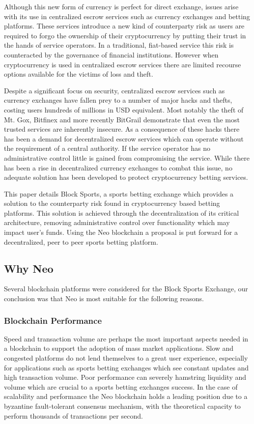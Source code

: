 \documentclass{article}
\begin{document}
Although this new form of currency is perfect for direct exchange, issues arise with its use in centralized escrow services such as currency exchanges and betting platforms. These services introduce a new kind of counterparty risk as users are required to forgo the ownership of their cryptocurrency by putting their trust in the hands of service operators. In a traditional, fiat-based service this risk is counteracted by the governance of financial institutions. However when cryptocurrency is used in centralized escrow services there are limited recourse options available for the victims of loss and theft.

Despite a significant focus on security, centralized escrow services such as currency exchanges have fallen prey to a number of major hacks and thefts, costing users hundreds of millions in USD equivalent. Most notably the theft of Mt. Gox, Bitfinex and more recently BitGrail demonstrate that even the most trusted services are inherently insecure. As a consequence of these hacks there has been a demand for decentralized escrow services which can operate without the requirement of a central authority. If the service operator has no administrative control little is gained from compromising the service. While there has been a rise in decentralized currency exchanges to combat this issue, no adequate solution has been developed to protect cryptocurrency betting services.

This paper details Block Sports, a sports betting exchange which provides a solution to the counterparty risk found in cryptocurrency based betting platforms. This solution is achieved through the decentralization of its critical architecture, removing administrative control over functionality which may impact user’s funds. Using the Neo blockchain a proposal is put forward for a decentralized, peer to peer sports betting platform.

	\subsection{Why Neo}
Several blockchain platforms were considered for the Block Sports Exchange, our conclusion was that Neo is most suitable for the following reasons.

		\subsubsection{Blockchain Performance}
Speed and transaction volume are perhaps the most important aspects needed in a blockchain to support the adoption of mass market applications. Slow and congested platforms do not lend themselves to a great user experience, especially for applications such as sports betting exchanges which see constant updates and high transaction volume. Poor performance can severely hamstring liquidity and volume which are crucial to a sports betting exchanges success. In the case of scalability and performance the Neo blockchain holds a leading position due to a byzantine fault-tolerant consensus mechanism, with the theoretical capacity to perform thousands of transactions per second.
\end{document}

